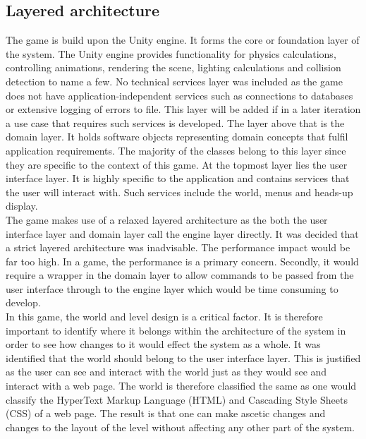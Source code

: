 \documentclass[11pt,a4paper]{article}
\begin{document}
\subsection{Layered architecture}
The game is build upon the Unity engine. It forms the core or foundation layer of the system. The Unity engine provides functionality for physics calculations, controlling animations, rendering the scene, lighting calculations and collision detection to name a few. No technical services layer was included as the game does not have application-independent services such as connections to databases or extensive logging of errors to file. This layer will be added if in a later iteration a use case that requires such services is developed. The layer above that is the domain layer. It holds software objects representing domain concepts that fulfil application requirements. The majority of the classes belong to this layer since they are specific to the context of this game. At the topmost layer lies the user interface layer. It is highly specific to the application and contains services that the user will interact with. Such services include the world, menus and heads-up display.\smallskip\\
The game makes use of a relaxed layered architecture as the both the user interface layer and domain layer call the engine layer directly. It was decided that a strict layered architecture was inadvisable. The performance impact would be far too high. In a game, the performance is a primary concern. Secondly, it would require a wrapper in the domain layer to allow commands to be passed from the user interface through to the engine layer which would be time consuming to develop. \smallskip\\
In this game, the world and level design is a critical factor. It is therefore important to identify where it belongs within the architecture of the system in order to see how changes to it would effect the system as a whole. It was identified that the world should belong to the user interface layer. This is justified as the user can see and interact with the world just as they would see and interact with a web page. The world is therefore classified the same as one would classify the HyperText Markup Language (HTML) and Cascading Style Sheets (CSS) of a web page. The result is that one can make ascetic changes and changes to the layout of the level without affecting any other part of the system.
\end{document}
